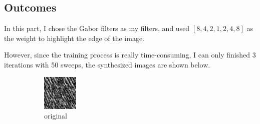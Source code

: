 \documentclass[11pt]{article}
\begin{document}
\subsection{Outcomes}
In this part, I chose the Gabor filters as my filters, and used $[8, 4, 2, 1, 2, 4, 8]$ as the weight to highlight the edge of the image.

However, since the training process is really time-consuming, I can only finished 3 iterations with 50 sweeps, the synthesized images are shown below.

\begin{figure}[ht!]
    \centering
    \hfill%
    \begin{subfigure}[]{0.333\linewidth}
        \centering
        \includegraphics[width=\linewidth]{figs_for_latex_only/original.jpg}
        \caption{original}
    \end{subfigure}%
    \hfill%
    \begin{subfigure}[]{0.333\linewidth}
        \centering

\end{subfigure}
\end{figure}
\end{document}

